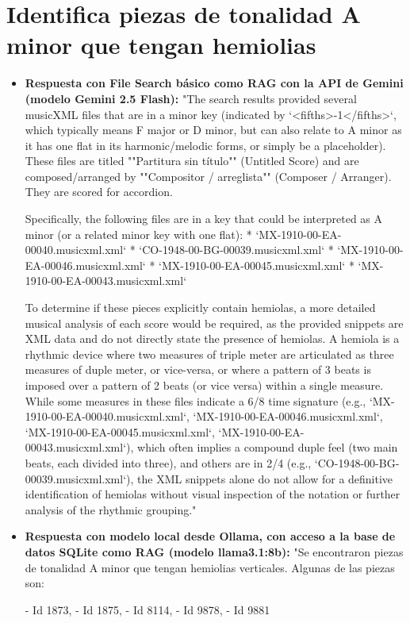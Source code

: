 \section{Identifica piezas de tonalidad A minor que tengan hemiolias}
\begin{itemize}
    \item \textbf{Respuesta con File Search básico como RAG con la API de Gemini (modelo Gemini 2.5 Flash):} "The search results provided several musicXML files that are in a minor key (indicated by `<fifths>-1</fifths>`, which typically means F major or D minor, but can also relate to A minor as it has one flat in its harmonic/melodic forms, or simply be a placeholder). These files are titled ""Partitura sin título"" (Untitled Score) and are composed/arranged by ""Compositor / arreglista"" (Composer / Arranger). They are scored for accordion.

Specifically, the following files are in a key that could be interpreted as A minor (or a related minor key with one flat):
*   `MX-1910-00-EA-00040.musicxml.xml`
*   `CO-1948-00-BG-00039.musicxml.xml`
*   `MX-1910-00-EA-00046.musicxml.xml`
*   `MX-1910-00-EA-00045.musicxml.xml`
*   `MX-1910-00-EA-00043.musicxml.xml`

To determine if these pieces explicitly contain hemiolas, a more detailed musical analysis of each score would be required, as the provided snippets are XML data and do not directly state the presence of hemiolas. A hemiola is a rhythmic device where two measures of triple meter are articulated as three measures of duple meter, or vice-versa, or where a pattern of 3 beats is imposed over a pattern of 2 beats (or vice versa) within a single measure. While some measures in these files indicate a 6/8 time signature (e.g., `MX-1910-00-EA-00040.musicxml.xml`, `MX-1910-00-EA-00046.musicxml.xml`, `MX-1910-00-EA-00045.musicxml.xml`, `MX-1910-00-EA-00043.musicxml.xml`), which often implies a compound duple feel (two main beats, each divided into three), and others are in 2/4 (e.g., `CO-1948-00-BG-00039.musicxml.xml`), the XML snippets alone do not allow for a definitive identification of hemiolas without visual inspection of the notation or further analysis of the rhythmic grouping."
    \item \textbf{Respuesta con modelo local desde Ollama, con acceso a la base de datos SQLite como RAG (modelo llama3.1:8b):} "Se encontraron piezas de tonalidad A minor que tengan hemiolias verticales. Algunas de las piezas son:

- Id 1873,
- Id 1875,
- Id 8114,
- Id 9878,
- Id 9881


\end{itemize}
